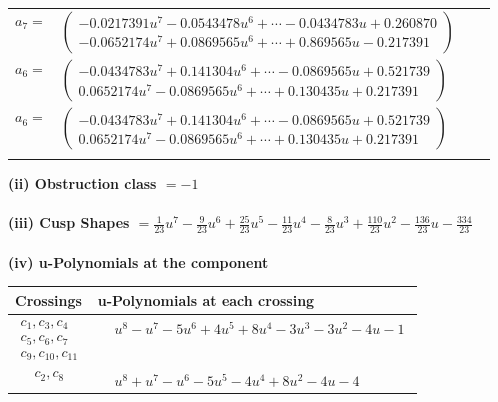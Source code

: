 \documentclass[1p]{elsarticle_modified}
\theoremstyle{definition}
\begin{document}
\begin{tabular}{m{7pt} m{180pt} m{7pt} m{180pt} }
\flushright $a_{7}=$&$\begin{pmatrix}-0.0217391 u^{7}-0.0543478 u^{6}+\cdots-0.0434783 u+0.260870\\-0.0652174 u^{7}+0.0869565 u^{6}+\cdots+0.869565 u-0.217391\end{pmatrix}$ \\
\flushright $a_{6}=$&$\begin{pmatrix}-0.0434783 u^{7}+0.141304 u^{6}+\cdots-0.0869565 u+0.521739\\0.0652174 u^{7}-0.0869565 u^{6}+\cdots+0.130435 u+0.217391\end{pmatrix}$\\ \flushright $a_{6}=$&$\begin{pmatrix}-0.0434783 u^{7}+0.141304 u^{6}+\cdots-0.0869565 u+0.521739\\0.0652174 u^{7}-0.0869565 u^{6}+\cdots+0.130435 u+0.217391\end{pmatrix}$\\&\end{tabular}
\flushleft \textbf{(ii) Obstruction class $= -1$}\\~\\
\flushleft \textbf{(iii) Cusp Shapes $= \frac{1}{23} u^7-\frac{9}{23} u^6+\frac{25}{23} u^5-\frac{11}{23} u^4-\frac{8}{23} u^3+\frac{110}{23} u^2-\frac{136}{23} u-\frac{334}{23}$}\\~\\
\newpage\renewcommand{\arraystretch}{1}
\flushleft \textbf{(iv) u-Polynomials at the component}\newline \\
\begin{tabular}{m{50pt}|m{274pt}}
Crossings & \hspace{64pt}u-Polynomials at each crossing \\
\hline $$\begin{aligned}c_{1},c_{3},c_{4}\\c_{5},c_{6},c_{7}\\c_{9},c_{10},c_{11}\end{aligned}$$&$\begin{aligned}
&u^8- u^7-5 u^6+4 u^5+8 u^4-3 u^3-3 u^2-4 u-1
\end{aligned}$\\
\hline $$\begin{aligned}c_{2},c_{8}\end{aligned}$$&$\begin{aligned}
&u^8+u^7- u^6-5 u^5-4 u^4+8 u^2-4 u-4
\end{aligned}$\\
\hline
\end{tabular}\\~\\
\end{document}

